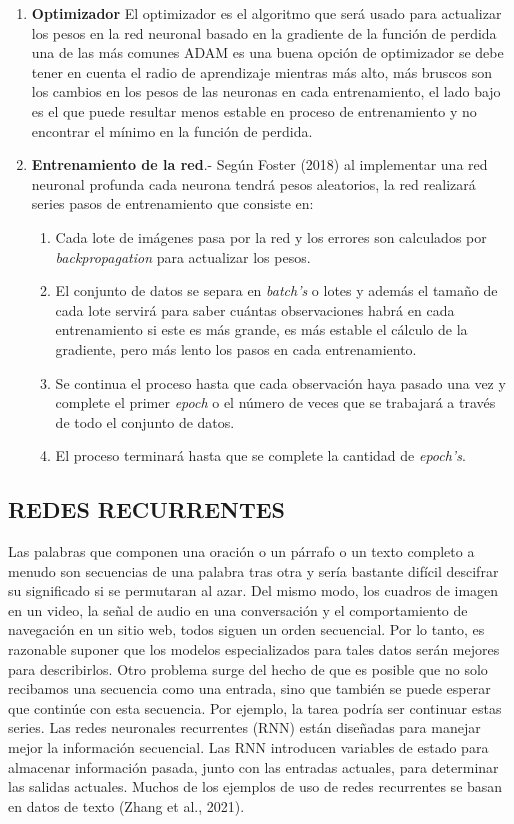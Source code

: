\documentclass[letter, openright, 12pt]{book}
\begin{document}
\begin{enumerate}[label=(\alph*)]
\item \textbf{Optimizador} El optimizador es el algoritmo que será usado para actualizar los pesos en la red neuronal basado en la gradiente de la función de perdida una de las más comunes ADAM es una buena opción de optimizador se debe tener en cuenta el radio de aprendizaje mientras más alto, más bruscos son los cambios en los pesos de las neuronas en cada entrenamiento, el lado bajo es el que puede resultar menos estable en proceso de entrenamiento y no encontrar el mínimo en la función de perdida.

\item \textbf{Entrenamiento de la red}.- Según Foster (2018) al implementar una red neuronal profunda cada neurona tendrá pesos aleatorios, la red realizará series pasos de entrenamiento que consiste en:

\begin{enumerate}
\item Cada lote de imágenes pasa por la red y los errores son calculados por \textit{backpropagation} para actualizar los pesos.
\item El conjunto de datos se separa en \textit{batch’s} o lotes y además el tamaño de cada lote servirá para saber cuántas observaciones habrá en cada entrenamiento si este es más grande, es más estable el cálculo de la gradiente, pero más lento los pasos en cada entrenamiento.
\item Se continua el proceso hasta que cada observación haya pasado una vez y complete el primer \textit{epoch} o el número de veces que se trabajará a través de todo el conjunto de datos.
\item El proceso terminará hasta que se complete la cantidad de \textit{epoch’s}.
\end{enumerate}

\end{enumerate}


\subsection{REDES RECURRENTES}
Las palabras que componen una oración o un párrafo o un texto completo a menudo son secuencias de una palabra tras otra y sería bastante difícil descifrar su significado si se permutaran al azar. Del mismo modo, los cuadros de imagen en un video, la señal de audio en una conversación y el comportamiento de navegación en un sitio web, todos siguen un orden secuencial. Por lo tanto, es razonable suponer que los modelos especializados para tales datos serán mejores para describirlos. Otro problema surge del hecho de que es posible que no solo recibamos una secuencia como una entrada, sino que también se puede esperar que continúe con esta secuencia. Por ejemplo, la tarea podría ser continuar estas series. Las redes neuronales recurrentes (RNN) están diseñadas para manejar mejor la información secuencial. Las RNN introducen variables de estado para almacenar información pasada, junto con las entradas actuales, para determinar las salidas actuales. Muchos de los ejemplos de uso de redes recurrentes se basan en datos de texto (Zhang et al., 2021).
\end{document}
